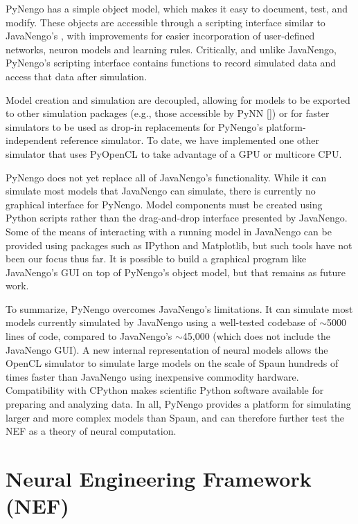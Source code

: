 \documentclass{frontiersSCNS}
\begin{document}
PyNengo has a simple object model,
which makes it easy to
document, test, and modify.
These objects are accessible
through a scripting interface
similar to JavaNengo's \citep{stewart2009},
with improvements
for easier incorporation of user-defined networks,
neuron models and learning rules.
Critically, and unlike JavaNengo,
PyNengo's scripting interface
contains functions to record simulated data
and access that data after simulation.

Model creation and simulation are decoupled,
allowing for models to be exported
to other simulation packages
(e.g., those accessible by PyNN [\citealp{davison2008}])
or for faster simulators to be used
as drop-in replacements for PyNengo's
platform-independent reference simulator.
To date, we have implemented one other simulator
that uses PyOpenCL to take advantage
of a GPU or multicore CPU.

PyNengo does not yet
replace all of JavaNengo's functionality.
While it can simulate most
models that JavaNengo can simulate,
there is currently no graphical interface for PyNengo.
Model components must be created
using Python scripts rather than
the drag-and-drop interface presented by JavaNengo.
Some of the means of interacting
with a running model in JavaNengo
can be provided using packages
such as IPython and Matplotlib,
but such tools have not been our focus thus far.
It is possible to build a graphical program
like JavaNengo's GUI on top of PyNengo's object model,
but that remains as future work.

To summarize, PyNengo overcomes
JavaNengo's limitations.
It can simulate most models
currently simulated by JavaNengo
using a well-tested codebase of
$\sim$5000 lines of code,
compared to JavaNengo's $\sim$45,000
(which does not include the JavaNengo GUI).
A new internal representation of neural models
allows the OpenCL simulator to simulate
large models on the scale of Spaun
hundreds of times faster than JavaNengo
using inexpensive commodity hardware.
Compatibility with CPython makes scientific Python software
available for preparing and analyzing data.
In all, PyNengo provides a platform for
simulating larger and more complex models than Spaun,
and can therefore further test the NEF
as a theory of neural computation.

\section{Neural Engineering Framework (NEF)}
\end{document}
